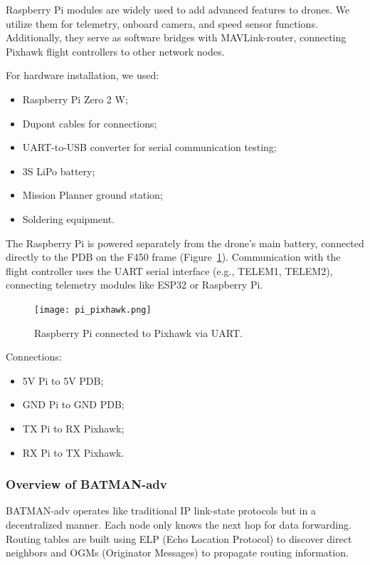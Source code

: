 Raspberry Pi modules are widely used to add advanced features to drones. We utilize them for telemetry, onboard camera, and speed sensor functions. Additionally, they serve as software bridges with MAVLink-router, connecting Pixhawk flight controllers to other network nodes.

For hardware installation, we used:
\begin{itemize}
    \item Raspberry Pi Zero 2 W;
    \item Dupont cables for connections;
    \item UART-to-USB converter for serial communication testing;
    \item 3S LiPo battery;
    \item Mission Planner ground station;
    \item Soldering equipment.
\end{itemize}

The Raspberry Pi is powered separately from the drone's main battery, connected directly to the PDB on the F450 frame (Figure~\ref{fig:pi_pixhawk}). Communication with the flight controller uses the UART serial interface (e.g., TELEM1, TELEM2), connecting telemetry modules like ESP32 or Raspberry Pi.

\begin{figure}[h!]
\centering
\texttt{[image: pi\_pixhawk.png]}
\caption{Raspberry Pi connected to Pixhawk via UART.}
\label{fig:pi_pixhawk}
\end{figure}

Connections:
\begin{itemize}
    \item 5V Pi to 5V PDB;
    \item GND Pi to GND PDB;
    \item TX Pi to RX Pixhawk;
    \item RX Pi to TX Pixhawk.
\end{itemize}

\subsubsection{Overview of BATMAN-adv}

BATMAN-adv operates like traditional IP link-state protocols but in a decentralized manner. Each node only knows the next hop for data forwarding. Routing tables are built using ELP (Echo Location Protocol) to discover direct neighbors and OGMs (Originator Messages) to propagate routing information.

